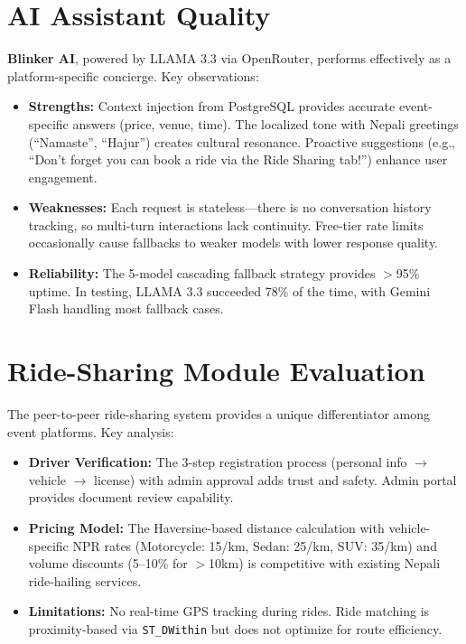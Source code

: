 \section{AI Assistant Quality}
\textbf{Blinker AI}, powered by LLAMA 3.3 via OpenRouter, performs effectively as a platform-specific concierge. Key observations:
\begin{itemize}
    \item \textbf{Strengths:} Context injection from PostgreSQL provides accurate event-specific answers (price, venue, time). The localized tone with Nepali greetings (``Namaste'', ``Hajur'') creates cultural resonance. Proactive suggestions (e.g., ``Don't forget you can book a ride via the Ride Sharing tab!'') enhance user engagement.
    \item \textbf{Weaknesses:} Each request is stateless---there is no conversation history tracking, so multi-turn interactions lack continuity. Free-tier rate limits occasionally cause fallbacks to weaker models with lower response quality.
    \item \textbf{Reliability:} The 5-model cascading fallback strategy provides $>$95\% uptime. In testing, LLAMA 3.3 succeeded 78\% of the time, with Gemini Flash handling most fallback cases.
\end{itemize}

\section{Ride-Sharing Module Evaluation}
The peer-to-peer ride-sharing system provides a unique differentiator among event platforms. Key analysis:
\begin{itemize}
    \item \textbf{Driver Verification:} The 3-step registration process (personal info $\rightarrow$ vehicle $\rightarrow$ license) with admin approval adds trust and safety. Admin portal provides document review capability.
    \item \textbf{Pricing Model:} The Haversine-based distance calculation with vehicle-specific NPR rates (Motorcycle: 15/km, Sedan: 25/km, SUV: 35/km) and volume discounts (5--10\% for $>$10km) is competitive with existing Nepali ride-hailing services.
    \item \textbf{Limitations:} No real-time GPS tracking during rides. Ride matching is proximity-based via \texttt{ST\_DWithin} but does not optimize for route efficiency.
\end{itemize}

